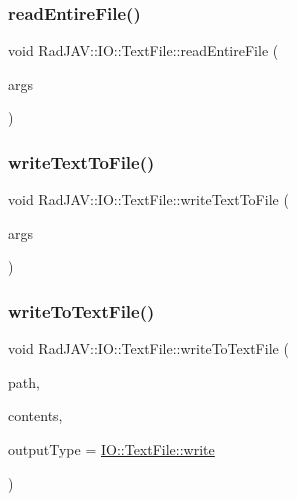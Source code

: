 \subsubsection{\texorpdfstring{read\+Entire\+File()}{readEntireFile()}}
{\footnotesize\ttfamily void Rad\+J\+A\+V\+::\+I\+O\+::\+Text\+File\+::read\+Entire\+File (\begin{DoxyParamCaption}\item[{const v8\+::\+Function\+Callback\+Info$<$ v8\+::\+Value $>$ \&}]{args }\end{DoxyParamCaption})\hspace{0.3cm}{\ttfamily [static]}}

\mbox{\label{class_rad_j_a_v_1_1_i_o_1_1_text_file_ae6790f6a469a8b598fc2b4cae37b143d}} 
\subsubsection{\texorpdfstring{write\+Text\+To\+File()}{writeTextToFile()}}
{\footnotesize\ttfamily void Rad\+J\+A\+V\+::\+I\+O\+::\+Text\+File\+::write\+Text\+To\+File (\begin{DoxyParamCaption}\item[{const v8\+::\+Function\+Callback\+Info$<$ v8\+::\+Value $>$ \&}]{args }\end{DoxyParamCaption})\hspace{0.3cm}{\ttfamily [static]}}

\mbox{\label{class_rad_j_a_v_1_1_i_o_1_1_text_file_a5ce86838dd6aadac22a6fd999e1c9d96}} 
\subsubsection{\texorpdfstring{write\+To\+Text\+File()}{writeToTextFile()}}
{\footnotesize\ttfamily void Rad\+J\+A\+V\+::\+I\+O\+::\+Text\+File\+::write\+To\+Text\+File (\begin{DoxyParamCaption}\item[{\mbox{\hyperlink{class_rad_j_a_v_1_1_string}{String}}}]{path,  }\item[{\mbox{\hyperlink{class_rad_j_a_v_1_1_string}{String}}}]{contents,  }\item[{R\+J\+I\+NT}]{output\+Type = {\ttfamily \mbox{\hyperlink{class_rad_j_a_v_1_1_i_o_1_1_text_file_a24c5acfee32c466406cf25bf5b04f566}{I\+O\+::\+Text\+File\+::write}}} }\end{DoxyParamCaption})\hspace{0.3cm}{\ttfamily [static]}}



